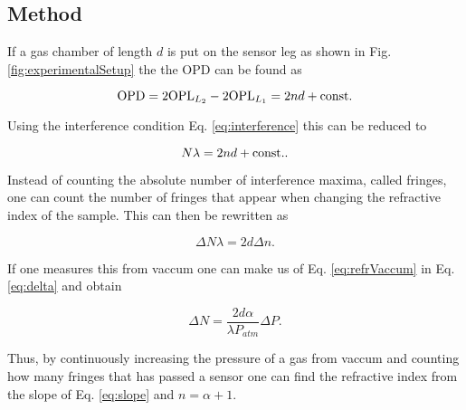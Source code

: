\subsection{Method}

If a gas chamber of length $d$ is put on the sensor leg as shown in Fig. \ref{fig:experimentalSetup} the the OPD can be found as

\begin{equation}
  \label{eq:OPD}
  \textnormal{OPD} = 2\textnormal{OPL}_{L_2} - 2\textnormal{OPL}_{L_1} = 2nd + \textnormal{const.}
\end{equation}

Using the interference condition Eq. \eqref{eq:interference} this can be reduced to

\begin{equation*}
  N \lambda = 2nd + \textnormal{const.}.
\end{equation*}

Instead of counting the absolute number of interference maxima, called fringes, one can count the number of fringes that appear when changing the refractive index of the sample. This can then be rewritten as

\begin{equation}
\label{eq:delta}
  \Delta N \lambda = 2d \Delta n.
\end{equation}

If one measures this from vaccum one can make us of Eq. \eqref{eq:refrVaccum} in Eq. \eqref{eq:delta} and obtain

\begin{equation}
\label{eq:slope}
  \Delta N = \frac{2d\alpha}{\lambda P_{atm}} \Delta P.
\end{equation}

Thus, by continuously increasing the pressure of a gas from vaccum and counting how many fringes that has passed a sensor one can find the refractive index from the slope of Eq. \eqref{eq:slope} and $n=\alpha+1$.

